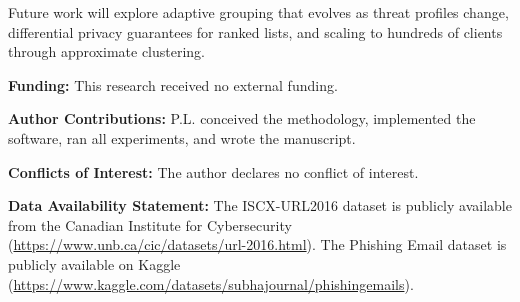 \documentclass[12pt,a4paper]{article}
\begin{document}
Future work will explore adaptive grouping that evolves as threat profiles change, differential privacy guarantees for ranked lists, and scaling to hundreds of clients through approximate clustering.

\vspace{1em}
\noindent\textbf{Funding:} This research received no external funding.

\vspace{0.5em}
\noindent\textbf{Author Contributions:} P.L. conceived the methodology, implemented the software, ran all experiments, and wrote the manuscript.

\vspace{0.5em}
\noindent\textbf{Conflicts of Interest:} The author declares no conflict of interest.

\vspace{0.5em}
\noindent\textbf{Data Availability Statement:} The ISCX-URL2016 dataset is publicly available from the Canadian Institute for Cybersecurity~\cite{mamun2016detecting} (\url{https://www.unb.ca/cic/datasets/url-2016.html}). The Phishing Email dataset is publicly available on Kaggle~\cite{subhajournal2023phishing} (\url{https://www.kaggle.com/datasets/subhajournal/phishingemails}).



\end{document}
